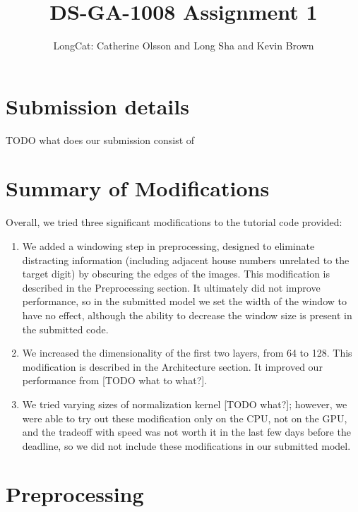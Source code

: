 \documentclass{article}
\title{DS-GA-1008 Assignment 1}
\author{LongCat: Catherine Olsson and Long Sha and Kevin Brown}
\begin{document}
 \maketitle


\section{Submission details}

TODO what does our submission consist of

\section{Summary of Modifications}

Overall, we tried three significant modifications to the tutorial code
provided:

\begin{enumerate}
\item We added a windowing step in preprocessing, designed to eliminate distracting information (including adjacent house numbers unrelated to the target digit) by obscuring the edges of the images. This modification is described in the Preprocessing section. It ultimately did not improve performance, so in the submitted model we set the width of the window to have no effect, although the ability to decrease the window size is present in the submitted code.

\item We increased the dimensionality of the first two layers, from 64 to 128. This modification is described in the Architecture section. It improved our performance from [TODO what to what?].

\item We tried varying sizes of normalization kernel [TODO what?]; however, we were able to try out these modification only on the CPU, not on the GPU, and the tradeoff with speed was not worth it in the last few days before the deadline, so we did not include these modifications in our submitted model.
\end{enumerate}

\section{Preprocessing}
\end{document}
